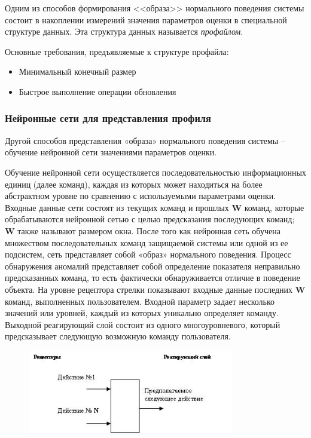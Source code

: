 Одним из способов формирования <<образа>> нормального поведения системы состоит в 
накоплении измерений значения параметров оценки в специальной структуре данных. 
Эта структура данных называется \textit{профайлом}.\autocite{IDSystem} 

Основные требования, предъявляемые к структуре профайла:
\begin{itemize}
	\item Минимальный конечный размер
	
	\item Быстрое выполнение операции обновления
\end{itemize}



\subsubsection{Нейронные сети для представления профиля}
Другой способов представления «образа» нормального поведения системы – обучение нейронной 
сети значениями параметров оценки.

Обучение нейронной сети осуществляется последовательностью информационных единиц (далее команд), 
каждая из которых может находиться на более абстрактном уровне по сравнению с используемыми 
параметрами оценки. Входные данные сети состоят из текущих команд и прошлых \textbf{W} команд, которые 
обрабатываются нейронной сетью с целью предсказания последующих команд; \textbf{W} также называют размером
окна. После того как нейронная сеть обучена множеством последовательных команд защищаемой системы или 
одной из ее подсистем, сеть представляет собой «образ» нормального поведения. Процесс обнаружения 
аномалий представляет собой определение показателя неправильно предсказанных команд, 
то есть фактически обнаруживается отличие в поведение объекта. На уровне рецептора стрелки 
показывают входные данные последних \textbf{W} команд, выполненных пользователем. Входной параметр задает 
несколько значений или уровней, каждый из которых уникально определяет команду. Выходной реагирующий 
слой состоит из одного многоуровневого, который предсказывает следующую возможную команду пользователя.
\autocite{BeynonDavies}

\begin{figure}[h!]
    \centering
    \includegraphics[width=0.8\textwidth]{assets/intrusion/нейронные сети.jpg}
\end{figure}

